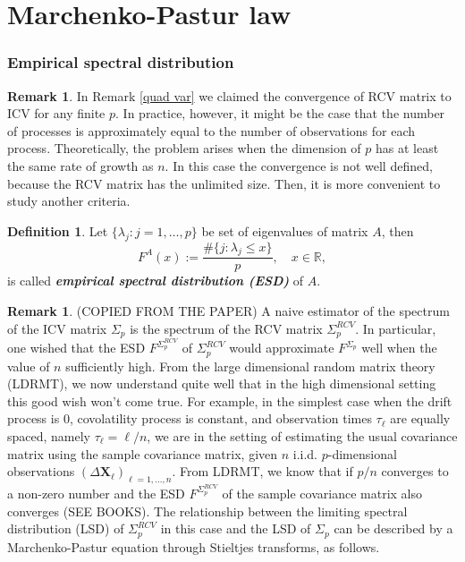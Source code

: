 \documentclass[a4paper,11pt]{article}
\theoremstyle{plain}
\theoremstyle{definition}
\newtheorem{defn}[thm]{Definition}
\newtheorem{rmrk}[thm]{Remark}
\newcommand{\MR}{\mathbb{R}}
\newcommand{\define}[1]{\textit{\textbf{#1}}}
\begin{document}
	\pagebreak
	\part{Marchenko-Pastur law}
	\section*{Empirical spectral distribution}
	\begin{rmrk}
		In Remark \ref{quad var} we claimed the convergence of RCV matrix to ICV for any finite $p$. In practice, however, it might be the case that the number of processes is approximately equal to the number of observations for each process. Theoretically, the problem arises when the dimension of $p$ has at least the same rate of growth as $n$. In this case the convergence is not well defined, because the RCV matrix has the unlimited size.
		Then, it is more convenient to study another criteria.
	\end{rmrk}
	
	\begin{defn}
		Let $\{\lambda_j:j=1,\dots, p\}$ be set of eigenvalues of matrix $A$, then
		\[F^{A}(x) := \frac{\#\{j:\lambda_j \leq x\}}{p}, \quad x \in \MR, \]
		is called \define{empirical spectral distribution (ESD)} of $A$.
	\end{defn}
	
	\begin{rmrk}
		(COPIED FROM THE PAPER)
		A naive estimator of the spectrum of the ICV matrix $\Sigma_p$ is the spectrum of the RCV matrix $\Sigma_p^{RCV}$. In particular, one wished that the ESD $F^{\Sigma_p^{RCV}}$ of $\Sigma_p^{RCV}$ would approximate $F^{\Sigma_p}$ well when the value of $n$ sufficiently high. From the large dimensional random matrix theory (LDRMT), we now understand quite well that in the high dimensional setting this good wish won't come true. For example, in the simplest case when the drift process is $0$, covolatility process is constant, and observation times $\tau_\ell$ are equally spaced, namely $\tau_\ell = \ell / n$, we are in the setting of estimating the usual covariance matrix using the sample covariance matrix, given $n$ i.i.d. $p$-dimensional observations $(\Delta \mathbf{X}_\ell)_{\ell=1, \dots, n}$. From LDRMT, we know that if $p/n$ converges to a non-zero number and the ESD $F^{\Sigma_p^{RCV}}$ of the sample covariance matrix also converges (SEE BOOKS). The relationship between the limiting spectral distribution (LSD) of $\Sigma_p^{RCV}$ in this case and the LSD of $\Sigma_p$ can be described by a Marchenko-Pastur equation through Stieltjes transforms, as follows.
	\end{rmrk}
	
\end{document}
